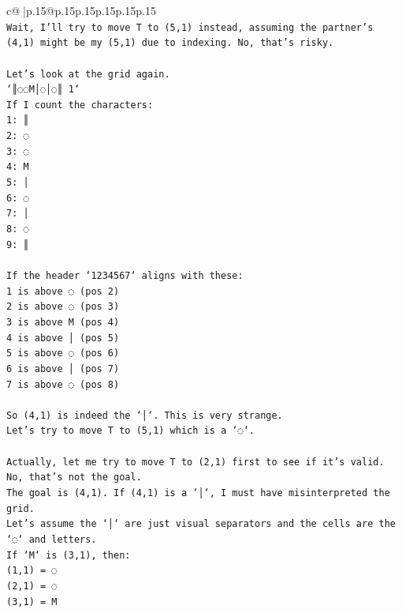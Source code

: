 \documentclass{article}
\begin{document}
{\begin{supertabular}{c@{$\;$}|p{.15\linewidth}@{}p{.15\linewidth}p{.15\linewidth}p{.15\linewidth}p{.15\linewidth}p{.15\linewidth}}
{{{\\ 
\texttt{Wait, I'll try to move T to (5,1) instead, assuming the partner's (4,1) might be my (5,1) due to indexing. No, that's risky.} \\
\\ 
\texttt{Let's look at the grid again.} \\
\texttt{`║◌◌M│◌│◌║ 1`} \\
\texttt{If I count the characters:} \\
\texttt{1: ║} \\
\texttt{2: ◌} \\
\texttt{3: ◌} \\
\texttt{4: M} \\
\texttt{5: │} \\
\texttt{6: ◌} \\
\texttt{7: │} \\
\texttt{8: ◌} \\
\texttt{9: ║} \\
\\ 
\texttt{If the header `1234567` aligns with these:} \\
\texttt{1 is above ◌ (pos 2)} \\
\texttt{2 is above ◌ (pos 3)} \\
\texttt{3 is above M (pos 4)} \\
\texttt{4 is above │ (pos 5)} \\
\texttt{5 is above ◌ (pos 6)} \\
\texttt{6 is above │ (pos 7)} \\
\texttt{7 is above ◌ (pos 8)} \\
\\ 
\texttt{So (4,1) is indeed the `│`. This is very strange.} \\
\texttt{Let's try to move T to (5,1) which is a `◌`.} \\
\\ 
\texttt{Actually, let me try to move T to (2,1) first to see if it's valid. No, that's not the goal.} \\
\texttt{The goal is (4,1). If (4,1) is a `│`, I must have misinterpreted the grid.} \\
\texttt{Let's assume the `│` are just visual separators and the cells are the `◌` and letters.} \\
\texttt{If `M` is (3,1), then:} \\
\texttt{(1,1) = ◌} \\
\texttt{(2,1) = ◌} \\
\texttt{(3,1) = M} \\
}}}
\end{supertabular}}
\end{document}
